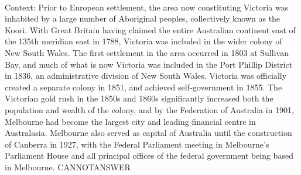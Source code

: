 \documentclass[11pt,a4paper, onecolumn]{article}
\begin{document}
\\ Context: Prior to European settlement, the area now constituting Victoria was inhabited by a large number of Aboriginal peoples, collectively known as the Koori. With Great Britain having claimed the entire Australian continent east of the 135th meridian east in 1788, Victoria was included in the wider colony of New South Wales. The first settlement in the area occurred in 1803 at Sullivan Bay, and much of what is now Victoria was included in the Port Phillip District in 1836, an administrative division of New South Wales. Victoria was officially created a separate colony in 1851, and achieved self-government in 1855. The Victorian gold rush in the 1850s and 1860s significantly increased both the population and wealth of the colony, and by the Federation of Australia in 1901, Melbourne had become the largest city and leading financial centre in Australasia. Melbourne also served as capital of Australia until the construction of Canberra in 1927, with the Federal Parliament meeting in Melbourne's Parliament House and all principal offices of the federal government being based in Melbourne. CANNOTANSWER
\end{document}
